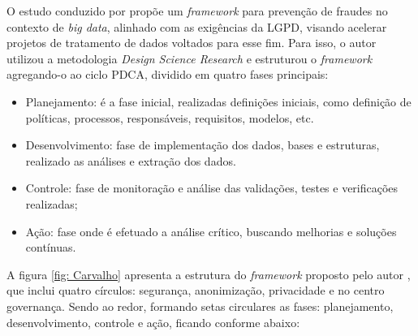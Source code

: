 \documentclass[
	12pt,				%
	openright,			%
	oneside,			%
	a4paper,			%
	english,			%
	french,				%
	spanish,			%
	brazil,				%
	]{abntex2}
\begin{document}
O estudo conduzido por   propõe um \textit{framework} para prevenção de fraudes no contexto de \textit{big data}, alinhado com as exigências da LGPD, visando acelerar projetos de tratamento de dados voltados para esse fim. Para isso, o autor utilizou a metodologia \textit{Design Science Research} e estruturou o \textit{framework} agregando-o ao ciclo PDCA, dividido em quatro fases principais:
\begin{itemize}
\item Planejamento: é a fase inicial, realizadas definições iniciais, como definição de políticas, processos, responsáveis, requisitos, modelos, etc.
\item Desenvolvimento: fase de implementação dos dados, bases e estruturas, realizado as análises e extração dos dados.
\item Controle: fase de monitoração e análise das validações, testes e verificações realizadas;
\item Ação: fase onde é efetuado a análise crítico, buscando melhorias e soluções contínuas.
\end{itemize}

A figura \ref{fig: Carvalho} apresenta a estrutura do \textit{framework} proposto pelo autor \cite{Carvalho2021}, que inclui quatro círculos: segurança, anonimização, privacidade e no centro governança. Sendo ao redor, formando setas circulares as fases: planejamento, desenvolvimento, controle e ação, ficando conforme abaixo:
\end{document}
